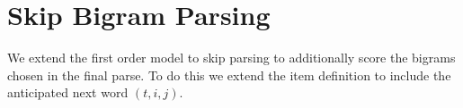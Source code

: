 \documentclass{article}
\begin{document}







\pagebreak

\section{Skip Bigram Parsing}

We extend the first order model to skip parsing to additionally score the bigrams chosen in the final parse. To do this we extend the item definition to include the anticipated next word $(t, i, j)$.
\end{document}

